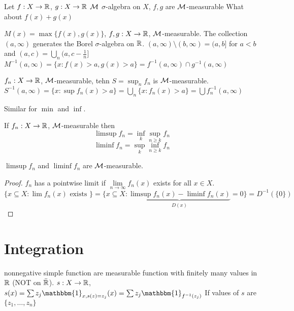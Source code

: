 Let $f: X \to \mathbb R$, $g: X \to \mathbb R$ $\mathcal M$ $\sigma$-algebra on $X$, $f, g$ are $\mathcal M$-measurable
What about $f(x) + g(x)$

$M(x) = \max\{f(x), g(x)\}$, $f,g: X \to \mathbb R$, $\mathcal M$-measurable.
The collection $(a, \infty)$ generates the Borel $\sigma$-algebra on $\mathbb R$.
$(a, \infty) \setminus (b, \infty) = (a, b]$ for $a < b$ and $(a, c) = \bigcup_n (a, c - \frac1n]$
$M^{-1}(a, \infty) = \{x : f(x) > a, g(x) > a\} = f^{-1}(a, \infty) \cap g^{-1}(a, \infty)$

$f_n: X \to \mathbb R$, $\mathcal M$-measurable, tehn $S = \sup_n f_n$ is $\mathcal M$-measurable.
$S^{-1}(a, \infty) = \{x : \sup f_n(x) > a\} = \bigcup_n \{x : f_n(x) > a\} = \bigcup f_n^{-1}(a, \infty)$

Similar for $\min$ and $\inf$.

\begin{definition}
If $f_n: X \to \mathbb R$, $\mathcal M$-measurable then \[\limsup f_n = \inf_k \sup_{n \ge k} f_n\]
\[\liminf f_n = \sup_k \inf_{n \ge k} f_n\]
\end{definition}

\begin{claim}
  $\limsup f_n$ and $\liminf f_n$ are $\mathcal M$-measurable.
\end{claim}

\begin{proof}
  $f_n$ has a pointwise limit if $\lim\limits_{n\to\infty}f_n(x)$ exists for all $x \in X$.
  $\{x \subseteq X : \lim f_n(x) \text{ exists }\} = \{x \subseteq X : \underbrace{\limsup f_n(x) - \liminf f_n(x)}_{D(x)} = 0\} = D^{-1}(\{0\})$
\end{proof}

\section{Integration}

nonnegative simple function are measurable function with finitely many values in $\mathbb R$ (NOT on $\bar{\mathbb R}$).
$s: X \to \mathbb R$, $s(x) = \sum z_j \mathbbm{1}_{x, s(z) = z_j}(x) = \sum z_j \mathbbm{1}_{f^{-1}({z_j})}$
If values of $s$ are $\{z_1, \dotsc, z_n\}$


